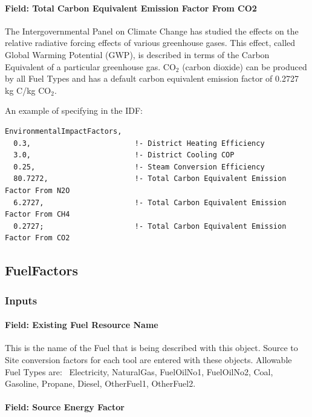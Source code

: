 \paragraph{Field: Total Carbon Equivalent Emission Factor From CO2}\label{field-total-carbon-equivalent-emission-factor-from-co2}

The Intergovernmental Panel on Climate Change has studied the effects on the relative radiative forcing effects of various greenhouse gases. This effect, called Global Warming Potential (GWP), is described in terms of the Carbon Equivalent of a particular greenhouse gas. CO\(_{2}\) (carbon dioxide) can be produced by all Fuel Types and has a default carbon equivalent emission factor of 0.2727 kg C/kg CO\(_{2}\).

An example of specifying in the IDF:

\begin{lstlisting}
EnvironmentalImpactFactors,
  0.3,                        !- District Heating Efficiency
  3.0,                        !- District Cooling COP
  0.25,                       !- Steam Conversion Efficiency
  80.7272,                    !- Total Carbon Equivalent Emission Factor From N2O
  6.2727,                     !- Total Carbon Equivalent Emission Factor From CH4
  0.2727;                     !- Total Carbon Equivalent Emission Factor From CO2
\end{lstlisting}

\subsection{FuelFactors}\label{fuelfactors}

\subsubsection{Inputs}\label{inputs-11-015}

\paragraph{Field: Existing Fuel Resource Name}\label{field-existing-fuel-resource-name}

This is the name of the Fuel that is being described with this object. Source to Site conversion factors for each tool are entered with these objects. Allowable Fuel Types are:~ Electricity, NaturalGas, FuelOilNo1, FuelOilNo2, Coal, Gasoline, Propane, Diesel, OtherFuel1, OtherFuel2.

\paragraph{Field: Source Energy Factor}\label{field-source-energy-factor}

